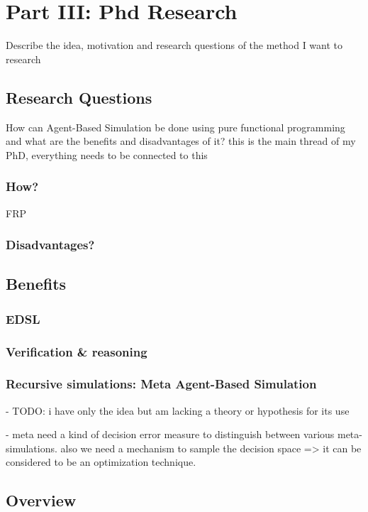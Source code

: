 \section{Part III: Phd Research} 
Describe the idea, motivation and research questions of the method I want to research 
 
\subsection{Research Questions} 
How can Agent-Based Simulation be done using pure functional programming and what are the benefits and disadvantages of it?
this is the main thread of my PhD, everything needs to be connected to this

\subsubsection{How?}
FRP

\subsubsection{Disadvantages?} 


\subsection{Benefits}
\subsubsection{EDSL}

\subsubsection{Verification \& reasoning}

\subsubsection{Recursive simulations: Meta Agent-Based Simulation}
- TODO:  i have only the idea but am lacking a theory or hypothesis for its use

- meta need a kind of decision error measure to distinguish between various meta-simulations. also we need a mechanism to sample the decision space => it can be considered to be an optimization technique.

\subsection{Overview}
